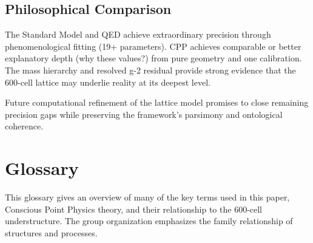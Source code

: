 \documentclass{article}
\begin{document}
\subsection{Philosophical Comparison}
The Standard Model and QED achieve extraordinary precision through phenomenological fitting (19+ parameters). CPP achieves comparable or better explanatory depth (why these values?) from pure geometry and one calibration. The mass hierarchy and resolved g-2 residual provide strong evidence that the 600-cell lattice may underlie reality at its deepest level.

Future computational refinement of the lattice model promises to close remaining precision gaps while preserving the framework's parsimony and ontological coherence.

\section{Glossary}

This glossary gives an overview of many of the key terms used in this paper, Conscious Point Physics theory, and their relationship to the 600-cell understructure. The group organization emphasizes the family relationship of structures and processes.
\end{document}
